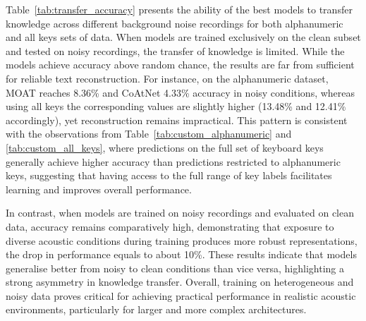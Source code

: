 \documentclass[a4paper,11pt,twoside]{report}
\theoremstyle{definition}
\begin{document}
Table~\ref{tab:transfer_accuracy} presents the ability of the best models to transfer knowledge across different background noise recordings for both alphanumeric and all keys sets of data. When models are trained exclusively on the clean subset and tested on noisy recordings, the transfer of knowledge is limited. While the models achieve accuracy above random chance, the results are far from sufficient for reliable text reconstruction. For instance, on the alphanumeric dataset, MOAT reaches 8.36\% and CoAtNet 4.33\% accuracy in noisy conditions, whereas using all keys the corresponding values are slightly higher (13.48\% and 12.41\% accordingly), yet reconstruction remains impractical. This pattern is consistent with the observations from Table~\ref{tab:custom_alphanumeric} and \ref{tab:custom_all_keys}, where predictions on the full set of keyboard keys generally achieve higher accuracy than predictions restricted to alphanumeric keys, suggesting that having access to the full range of key labels facilitates learning and improves overall performance.

In contrast, when models are trained on noisy recordings and evaluated on clean data, accuracy remains comparatively high, demonstrating that exposure to diverse acoustic conditions during training produces more robust representations, the drop in performance equals to about 10\%. These results indicate that models generalise better from noisy to clean conditions than vice versa, highlighting a strong asymmetry in knowledge transfer. Overall, training on heterogeneous and noisy data proves critical for achieving practical performance in realistic acoustic environments, particularly for larger and more complex architectures.
\end{document}
